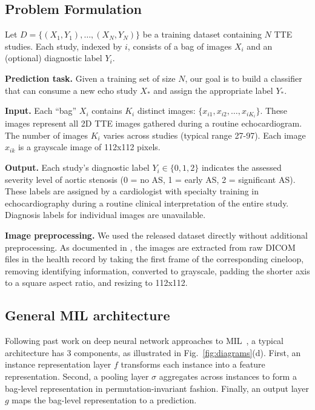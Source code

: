 \subsection{Problem Formulation}
\label{sec:methods_formulation}

Let $D=\{(X_1, Y_1), \ldots, (X_N, Y_N)\}$ be a training dataset containing $N$ TTE studies. Each study, indexed by $i$, consists of a bag of images $X_i$ and an (optional) diagnostic label $Y_i$.

\textbf{Prediction task.} Given a training set of size $N$, our goal is to build a classifier that can consume a new echo study $X_*$ and assign the appropriate label $Y_*$.

\textbf{Input.}
Each ``bag'' $X_i$ contains $K_i$ distinct images: $\{x_{i1}, x_{i2}, \ldots, x_{iK_i}\}$. These images represent all 2D TTE images gathered during a routine echocardiogram. 
The number of images $K_i$ varies across studies (typical range 27-97).  
Each image $x_{ik}$ is a grayscale image of 112x112 pixels.

\textbf{Output.}
Each study's diagnostic label $Y_i \in \{0, 1, 2\}$ indicates the assessed severity level of aortic stenosis (0 = no AS, 1 =  early AS, 2 = significant AS). These labels are assigned by a cardiologist with specialty training in echocardiography during a routine clinical interpretation of the entire study. Diagnosis labels for individual images are unavailable. 

\textbf{Image preprocessing.}
We used the released dataset directly without additional preprocessing. 
As documented in \citet{huang2022tmed}, the images are extracted from raw DICOM files in the health record by taking the first frame of the corresponding cineloop, removing identifying information, converted to grayscale, padding the shorter axis to a square aspect ratio, and resizing to 112x112. 



\subsection{General MIL architecture}
\label{sec:base_arch}

Following past work on deep neural network approaches to MIL~\citep{ilse2018attention, li2021dual}, a typical architecture has 3 components, as illustrated in Fig.~\ref{fig:diagrams}(d). First, an instance representation layer $f$ transforms each instance into a feature representation. Second, a pooling layer $\sigma$ aggregates across instances to form a bag-level representation in permutation-invariant fashion. Finally, an output layer $g$ 
maps the bag-level representation to a prediction.

